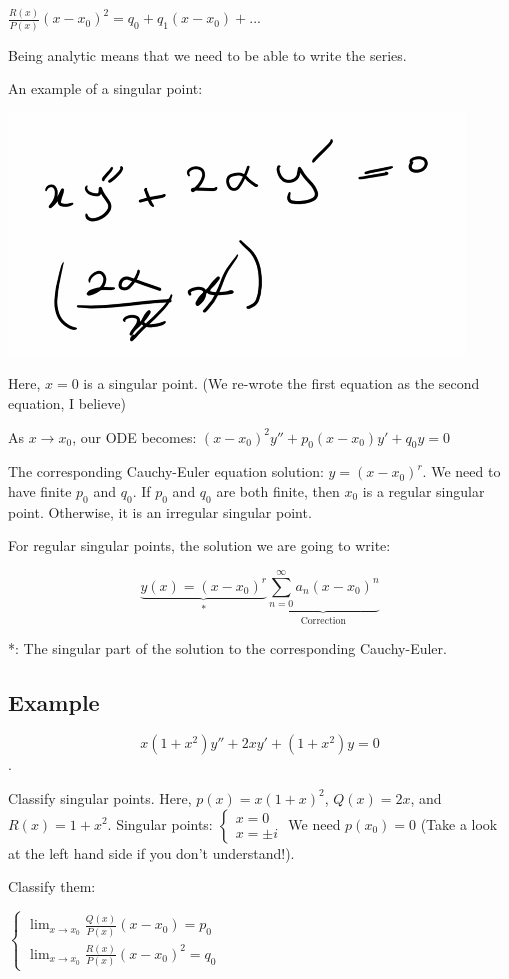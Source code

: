 \documentclass{article}
\begin{document}
$\frac{R(x)}{P(x)} (x - x_0)^2 = q_0 + q_1 (x - x_0) + ...$

Being analytic means that we need to be able to write the series. 

An example of a singular point:

\includegraphics[width = 0.6 \textwidth]{image1.png}

Here, $x = 0$ is a singular point. (We re-wrote the first equation as the second equation, I believe)

\hfill \break

As $x \longrightarrow x_0$, our ODE becomes: $(x - x_0)^2 y'' + p_0 (x - x_0) y' + q_0 y = 0$

The corresponding Cauchy-Euler equation solution: $y = (x - x_0)^r$. We need to have finite $p_0$ and $q_0$. If $p_0$ and $q_0$ are both finite, then $x_0$ is a regular singular point. Otherwise, it is an irregular singular point. 

For regular singular points, the solution we are going to write: 

$$\underbrace{y(x) = (x - x_0)^r}_{*} \underbrace{\sum_{n = 0}^{\infty} a_n (x - x_0)^n}_{\text{Correction}}$$

*: The singular part of the solution to the corresponding Cauchy-Euler. 

\subsection{Example}

$$x(1+x^2) y'' + 2xy' + (1+x^2) y = 0$$. 

Classify singular points. Here, $p(x) = x(1+x)^2$, $Q(x) = 2x$, and $R(x) = 1+x^2$. Singular points: $\left\{ \begin{matrix} x = 0 \\ x = \pm i \end{matrix} \right.$ We need $p(x_0) = 0$ (Take a look at the left hand side if you don't understand!). 

Classify them:

$\left\{ \begin{matrix} \lim_{x \rightarrow x_0} \frac{Q(x)}{P(x)} (x - x_0) = p_0 \\ \lim_{x \rightarrow x_0} \frac{R(x)}{P(x)} (x - x_0)^2 = q_0 \end{matrix} \right.$
\end{document}
